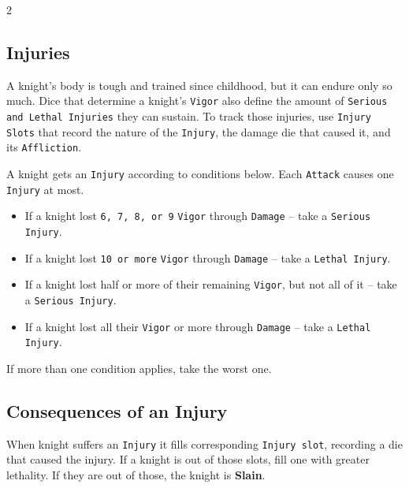 \documentclass{osr-template/zine}
\begin{document}
\begin{multicols*}{2}
\subsection*{Injuries}
\label{sec:injuries}

A knight's body is tough and trained since childhood, but it can endure only so much.
Dice that determine a knight's \texttt{Vigor} also define the amount of \texttt{Serious and Lethal Injuries} they can sustain.
To track those injuries, use \texttt{Injury Slots} that record the nature of the \texttt{Injury}, the damage die that caused it, and its \texttt{Affliction}.

A knight gets an \texttt{Injury} according to conditions below. Each \texttt{Attack} causes one \texttt{Injury} at most.

\begin{itemize}[nosep]
    \item[\ding{170}] If a knight lost \texttt{6, 7, 8, or 9} \texttt{Vigor} through \texttt{Damage} -- take a \texttt{Serious Injury}.
    \item[\textbf{\textdagger}] If a knight lost \texttt{10 or more} \texttt{Vigor} through \texttt{Damage} -- take a \texttt{Lethal Injury}.
    \item[\ding{170}] If a knight lost half or more of their remaining \texttt{Vigor}, but not all of it -- take a \texttt{Serious Injury}.
    \item[\textbf{\textdagger}] If a knight lost all their \texttt{Vigor} or more through \texttt{Damage} -- take a \texttt{Lethal Injury}.
\end{itemize}
If more than one condition applies, take the worst one.

\subsection*{Consequences of an Injury} When knight suffers an \texttt{Injury} it fills corresponding \texttt{Injury slot}, recording a die that caused the injury.
If a knight is out of those slots, fill one with greater lethality. If they are out of those, the knight is \textbf{Slain}.


\end{multicols*}
\end{document}
